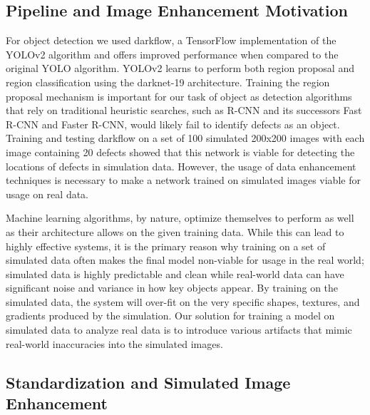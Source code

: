 \documentclass[prl,reprint,showpacs,floatfix,nofootinbib]{revtex4-1}
\begin{document}
\subsection{Pipeline and Image Enhancement Motivation}
For object detection we used darkflow, a TensorFlow implementation of the YOLOv2 algorithm \cite{redmon_yolo9000:_2016} and offers improved performance when compared to the original YOLO algorithm\cite{redmon_you_2015}. YOLOv2 learns to perform both region proposal and region classification using the darknet-19 architecture. Training the region proposal mechanism is important for our task of object as detection algorithms that rely on traditional heuristic searches, such as R-CNN\cite{girshick_rich_2013} and its successors Fast R-CNN\cite{girshick_fast_2015} and Faster R-CNN\cite{ren_faster_2017}, would likely fail to identify defects as an object. Training and testing darkflow on a set of 100 simulated 200x200 images with each image containing 20 defects showed that this network is viable for detecting the locations of defects in simulation data. However, the usage of data enhancement techniques is necessary to make a network trained on simulated images viable for usage on real data. 

Machine learning algorithms, by nature, optimize themselves to perform as well as their architecture allows on the given training data. While this can lead to highly effective systems, it is the primary reason why training on a set of simulated data often makes the final model non-viable for usage in the real world; simulated data is highly predictable and clean while real-world data can have significant noise and variance in how key objects appear. By training on the simulated data, the system will over-fit\cite{lawrence_lessons_1997} \cite{lever_model_2016} on the very specific shapes, textures, and gradients produced by the simulation. %
Our solution for training a model on simulated data to analyze real data is to introduce various artifacts that mimic real-world inaccuracies into the simulated images.

\subsection{Standardization and Simulated Image Enhancement}
\end{document}
